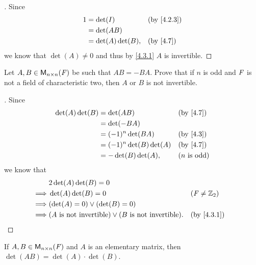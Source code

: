 \begin{proof}[]
	Since
	\begin{align*}
		1 & = \det(I)          &  & \by{4.2.3} \\
		  & = \det(AB)                         \\
		  & = \det(A) \det(B), &  & \by{4.7}
	\end{align*}
	we know that \(\det(A) \neq 0\) and thus by \cref{4.3.1} \(A\) is invertible.
\end{proof}

\begin{ex}\label{ex:4.3.17}
	Let \(A, B \in \mathsf{M}_{{n} \times n}({\mathit{F}})\) be such that \(AB = -BA\).
	Prove that if \(n\) is odd and \(\mathit{F}\) is not a field of characteristic two, then \(A\) or \(B\) is not invertible.
\end{ex}

\begin{proof}[]
	Since
	\begin{align*}
		\det(A) \det(B) & = \det(AB)               &  & \by{4.7}              \\
		                & = \det(-BA)                                         \\
		                & = (-1)^n \det(BA)        &  & \by{4.3}              \\
		                & = (-1)^n \det(B) \det(A) &  & \by{4.7}              \\
		                & = -\det(B) \det(A),      &  & \text{(\(n\) is odd)}
	\end{align*}
	we know that
	\begin{align*}
		         & 2 \det(A) \det(B) = 0                                                                 \\
		\implies & \det(A) \det(B) = 0                                               &  & (\F \neq \Z_2) \\
		\implies & (\det(A) = 0) \lor (\det(B) = 0)                                                      \\
		\implies & (A \text{ is not invertible}) \lor (B \text{ is not invertible}). &  & \by{4.3.1}
	\end{align*}
\end{proof}

\begin{ex}\label{ex:4.3.18}
	If \(A, B \in \mathsf{M}_{{n} \times n}({\mathit{F}})\) and \(A\) is an elementary matrix, then \(\det(AB) = \det(A) \cdot \det(B)\).
\end{ex}

